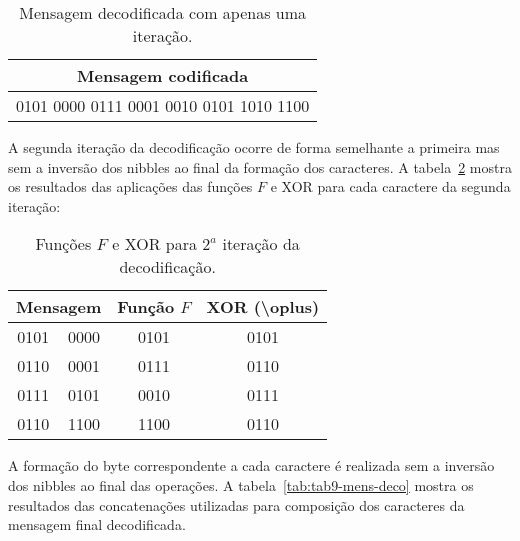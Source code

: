 \documentclass[a4paper,pra,aps,twocolumn,superscriptaddress,10pt,final]{revtex4-2}
\begin{document}
    \vspace{-0.5cm}
    
    \begin{table}[!htpb]
        \caption{Mensagem decodificada com apenas uma iteração.}
        \label{tab:tab7-iter1-deco}
        \begin{tabular}{|clll|}
        \hline
        \multicolumn{4}{|c|}{\textbf{Mensagem codificada}}            \\ \hline
        \multicolumn{4}{|c|}{0101 0000 0111 0001 0010 0101 1010 1100} \\ \hline
        \end{tabular}%
    \end{table}

    A segunda iteração da decodificação ocorre de forma semelhante a primeira mas sem a inversão dos nibbles ao final da formação dos caracteres. A tabela~\ref{tab:tab8-funcao-deco} mostra os resultados das aplicações das funções $F$ e XOR para cada caractere da segunda iteração:
    
    \vspace{-0.25cm}

    \begin{table}[!htpb]
        \caption{Funções $F$ e XOR para $2^a$ iteração da decodificação.}
        \label{tab:tab8-funcao-deco}
        \begin{tabular}{|cc|c|c|}
            \hline
            \multicolumn{2}{|c|}{\textbf{Mensagem}} & \textbf{Função $F$} & \textbf{XOR (\textbackslash{}oplus)} \\ \hline
            \multicolumn{1}{|c|}{0101}    & 0000    & 0101                & 0101                                 \\ \hline
            \multicolumn{1}{|c|}{0110}    & 0001    & 0111                & 0110                                 \\ \hline
            \multicolumn{1}{|c|}{0111}    & 0101    & 0010                & 0111                                 \\ \hline
            \multicolumn{1}{|c|}{0110}    & 1100    & 1100                & 0110                                 \\ \hline
            \end{tabular}
    \end{table}

    A formação do byte correspondente a cada caractere é realizada sem a inversão dos nibbles ao final das operações. A tabela~\ref{tab:tab9-mens-deco} mostra os resultados das concatenações utilizadas para composição dos caracteres da mensagem final decodificada.
\end{document}

